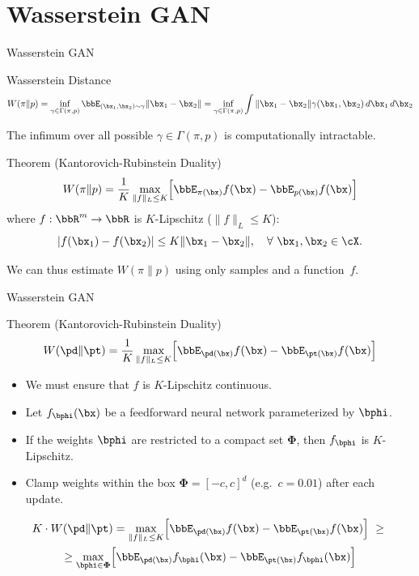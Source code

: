 \documentclass{beamer}
\begin{document}
\section{Wasserstein GAN}
\begin{frame}{Wasserstein GAN}
	\begin{block}{Wasserstein Distance}
		\vspace{-0.5cm}
		\small
		\[
		W(\pi \| p) = \inf_{\gamma \in \Gamma(\pi, p)} \bbE_{(\bx_1, \bx_2) \sim \gamma} \| \bx_1 - \bx_2 \| =  \inf_{\gamma \in \Gamma(\pi, p)} \int \|\bx_1 - \bx_2\| \gamma (\bx_1, \bx_2)\, d\bx_1\, d\bx_2
		\]
		\vspace{-0.3cm}
	\end{block}
	\eqpause
	The infimum over all possible $\gamma \in \Gamma(\pi, p)$ is computationally intractable.
	\eqpause
	\begin{block}{Theorem (Kantorovich-Rubinstein Duality)}
		\vspace{-0.3cm}
		\[
			W(\pi \| p) = \frac{1}{K} \max_{\| f \|_L \leq K} \Bigl[ \bbE_{\pi(\bx)} f(\bx)  - \bbE_{p(\bx)} f(\bx)\Bigr]
		\]
		where $f : \bbR^m \rightarrow \bbR$ is $K$-Lipschitz ($\|f\|_L \leq K$):
		\[
			|f(\bx_1) - f(\bx_2)| \leq K \|\bx_1 - \bx_2\|,\quad \forall\ \bx_1, \bx_2 \in \cX.
		\]
		\vspace{-0.6cm}
	\end{block}
	\eqpause
	We can thus estimate $W(\pi \| p)$ using only samples and a function~$f$.
\end{frame}
\begin{frame}{Wasserstein GAN}
	\begin{block}{Theorem (Kantorovich-Rubinstein Duality)}
		\[
		W(\pd \| \pt) = \frac{1}{K} \max_{\| f \|_L \leq K} \Bigl[ \bbE_{\pd(\bx)} f(\bx)  - \bbE_{\pt(\bx)} f(\bx)\Bigr]
		\]
	\end{block}
	\begin{itemize}
		\item We must ensure that $f$ is $K$-Lipschitz continuous.
		\item Let $f_{\bphi}(\bx)$ be a feedforward neural network parameterized by $\bphi$.
		\item If the weights $\bphi$ are restricted to a compact set $\boldsymbol{\Phi}$, then $f_{\bphi}$ is $K$-Lipschitz.
		\eqpause
		\item Clamp weights within the box $\boldsymbol{\Phi} = [-c, c]^d$ (e.g.\ $c = 0.01$) after each update.
	\end{itemize}
	\begin{multline*}
		K \cdot W(\pd \| \pt) = \max_{\| f \|_L \leq K} \Bigl[ \bbE_{\pd(\bx)} f(\bx)  - \bbE_{\pt(\bx)} f(\bx)\Bigr]\ \geq\ 
		\\  \geq \max_{\bphi \in \boldsymbol{\Phi}} \Bigl[ \bbE_{\pd(\bx)} f_{\bphi}(\bx)  - \bbE_{\pt(\bx)} f_{\bphi}(\bx)\Bigr]
	\end{multline*}
\end{frame}
\end{document}
